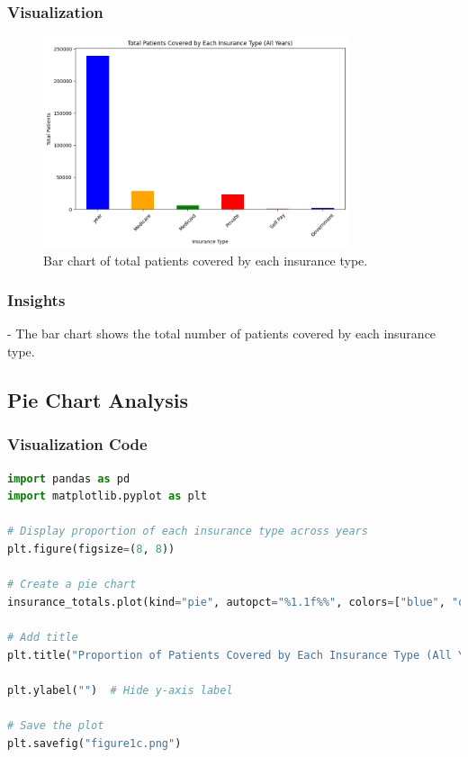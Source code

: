 \documentclass[a4paper,10pt]{article}
\begin{document}
\subsubsection{Visualization}

\begin{figure}[h]
    \centering
    \includegraphics[width=0.8\textwidth]{figure1b.png}
    \caption{Bar chart of total patients covered by each insurance type.}
    \label{fig:bar_chart}
\end{figure}

\subsubsection{Insights}
- The bar chart shows the total number of patients covered by each insurance type.

\subsection{Pie Chart Analysis}

\subsubsection{Visualization Code}
\begin{lstlisting}[language=Python]
import pandas as pd
import matplotlib.pyplot as plt

# Display proportion of each insurance type across years
plt.figure(figsize=(8, 8))

# Create a pie chart
insurance_totals.plot(kind="pie", autopct="%1.1f%%", colors=["blue", "orange", "green", "red", "purple"])

# Add title
plt.title("Proportion of Patients Covered by Each Insurance Type (All Years)")

plt.ylabel("")  # Hide y-axis label

# Save the plot
plt.savefig("figure1c.png")
\end{lstlisting}
\end{document}

